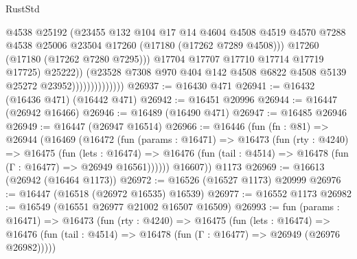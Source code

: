 \begin{lexlean}{RustStd}
\begin{coremodule}
                                      @4538
                                      @25192
                                      (@23455
                                        @132
                                        @104
                                        @17
                                        @14
                                        @4604
                                        @4508
                                        @4519
                                        @4570
                                        @7288
                                        @4538
                                        @25006
                                        @23504
                                        @17260
                                        (@17180 (@17262 @7289 @4508)))
                                      @17260
                                      (@17180 (@17262 @7280 @7295)))
                                    @17704
                                    @17707
                                    @17710
                                    @17714
                                    @17719
                                    @17725)
                                  @25222))
                              (@23528
                                @7308
                                @970
                                @404
                                @142
                                @4508
                                @6822
                                @4508
                                @5139
                                @25272
                                @23952))))))))))))))
@26937 := @16430 @471
@26941 := @16432 (@16436 @471) (@16442 @471)
@26942 := @16451 @20996
@26944 := @16447 (@26942 @16466)
@26946 := @16489 (@16490 @471)
@26947 := @16485 @26946
@26949 := @16447 (@26947 @16514)
@26966 := @16446
    (fun (fn : @81) =>
    @26944
      (@16469
        (@16472
          (fun (params : @16471) =>
          @16473
            (fun (rty : @4240) =>
            @16475
              (fun (lets : @16474) =>
              @16476 (fun (tail : @4514) => @16478 (fun (Γ : @16477) => @26949 @16561))))))
        @16607))
    @1173
@26969 := @16613 (@26942 (@16464 @1173))
@26972 := @16526 (@16527 @1173) @20999
@26976 := @16447 (@16518 (@26972 @16535) @16539)
@26977 := @16552 @1173
@26982 := @16549 (@16551 @26977 @21002 @16507 @16509)
@26993 := fun (params : @16471) =>
  @16473
    (fun (rty : @4240) =>
    @16475
      (fun (lets : @16474) =>
      @16476 (fun (tail : @4514) => @16478 (fun (Γ : @16477) => @26949 (@26976 @26982)))))

\end{coremodule}
\end{lexlean}
